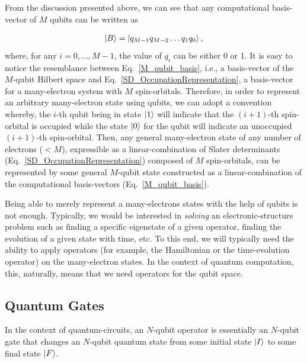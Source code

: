 \documentclass[12pt,oneside]{book}
\begin{document}
From the discussion presented above, we can see that any computational basis-vector of $M$ qubits can be written as

\begin{align}\label{M_qubit_basis}
    \ket{B} = \ket{q_{M-1}q_{M-2}\hdots q_1 q_0},
\end{align}
where, for any $i=0,\hdots,M-1$, the value of $q_i$ can be either 0 or 1. It is easy to notice the resemblance between Eq.~\ref{M_qubit_basis}, i.e., a basis-vector of the $M$-qubit Hilbert space and Eq.~\ref{SD_OccupationRepresentation}, a basis-vector for a many-electron system with $M$ spin-orbitals. Therefore, in order to represent an arbitrary many-electron state using qubits, we can adopt a convention whereby, the $i$-th qubit being in state $\ket{1}$ will indicate that the $(i+1)$-th spin-orbital is occupied while the state $\ket{0}$ for the qubit will indicate an unoccupied $(i+1)$-th spin-orbital. Then, any general many-electron state of any number of electrons ($<M$), expressible as a linear-combination of Slater determinants (Eq.~\ref{SD_OccupationRepresentation}) composed of $M$ spin-orbitals, can be represented by some general $M$-qubit state constructed as a linear-combination of the computational basis-vectors (Eq.~\ref{M_qubit_basis}).  

Being able to merely represent a many-electrons states with the help of qubits is not enough. Typically, we would be interested in \textit{solving} an electronic-structure problem such as finding a specific eigenstate of a given operator, finding the evolution of a given state with time, etc. To this end, we will typically need the ability to apply operators (for example, the Hamiltonian or the time-evolution operator) on the many-electron states. In the context of quantum computation, this, naturally, means that we need operators for the qubit space. 

\subsection*{Quantum Gates}

In the context of quantum-circuits, an $N$-qubit operator is essentially an $N$-qubit gate that changes an $N$-qubit quantum state from some initial state $\ket{I}$ to some final state $\ket{F}$.
\end{document}
